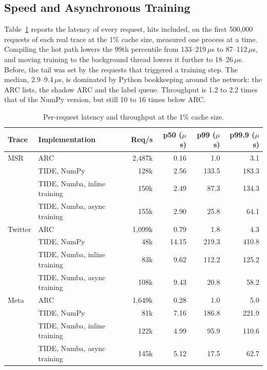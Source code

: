 \documentclass{llncs}
\begin{document}
\subsection{Speed and Asynchronous Training}

Table~\ref{tab:speed} reports the latency of every request, hits included, on the first 500,000 requests of each real trace at the 1\% cache size, measured one process at a time. Compiling the hot path lowers the 99th percentile from 133--219\,$\mu$s to 87--112\,$\mu$s, and moving training to the background thread lowers it further to 18--26\,$\mu$s. Before, the tail was set by the requests that triggered a training step. The median, 2.9--9.4\,$\mu$s, is dominated by Python bookkeeping around the network: the ARC lists, the shadow ARC and the label queue. Throughput is 1.2 to 2.2 times that of the NumPy version, but still 10 to 16 times below ARC.

\begin{table}[htbp]
\centering
\caption{Per-request latency and throughput at the 1\% cache size.}
\label{tab:speed}
\setlength{\tabcolsep}{4pt}
\small
\begin{tabular}{llrrrr}
\toprule
Trace & Implementation & Req/s & p50 ($\mu$s) & p99 ($\mu$s) & p99.9 ($\mu$s) \\
\midrule
MSR & ARC & 2,487k & 0.16 & 1.0 & 3.1 \\
 & TIDE, NumPy & 128k & 2.56 & 133.5 & 183.3 \\
 & TIDE, Numba, inline training & 150k & 2.49 & 87.3 & 134.3 \\
 & TIDE, Numba, async training & 155k & 2.90 & 25.8 & 64.1 \\
\midrule
Twitter & ARC & 1,099k & 0.79 & 1.8 & 4.3 \\
 & TIDE, NumPy & 48k & 14.15 & 219.3 & 410.8 \\
 & TIDE, Numba, inline training & 83k & 9.62 & 112.2 & 125.2 \\
 & TIDE, Numba, async training & 108k & 9.43 & 20.8 & 58.2 \\
\midrule
Meta & ARC & 1,649k & 0.28 & 1.0 & 5.0 \\
 & TIDE, NumPy & 81k & 7.16 & 186.8 & 221.9 \\
 & TIDE, Numba, inline training & 122k & 4.99 & 95.9 & 110.6 \\
 & TIDE, Numba, async training & 145k & 5.12 & 17.5 & 62.7 \\
\bottomrule
\end{tabular}
\end{table}
\end{document}
